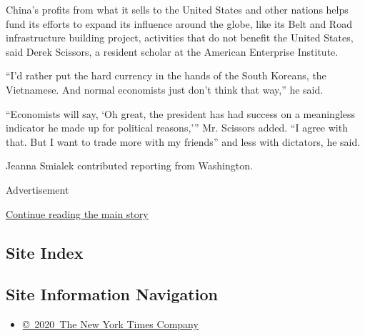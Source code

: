China's profits from what it sells to the United States and other
nations helps fund its efforts to expand its influence around the globe,
like its Belt and Road infrastructure building project, activities that
do not benefit the United States, said Derek Scissors, a resident
scholar at the American Enterprise Institute.

``I'd rather put the hard currency in the hands of the South Koreans,
the Vietnamese. And normal economists just don't think that way,'' he
said.

``Economists will say, `Oh great, the president has had success on a
meaningless indicator he made up for political reasons,''' Mr. Scissors
added. ``I agree with that. But I want to trade more with my friends''
and less with dictators, he said.

Jeanna Smialek contributed reporting from Washington.

Advertisement

\protect\hyperlink{after-bottom}{Continue reading the main story}

\hypertarget{site-index}{%
\subsection{Site Index}\label{site-index}}

\hypertarget{site-information-navigation}{%
\subsection{Site Information
Navigation}\label{site-information-navigation}}

\begin{itemize}
\tightlist
\item
  \href{https://help.nytimes3xbfgragh.onion/hc/en-us/articles/115014792127-Copyright-notice}{©~2020~The
  New York Times Company}
\end{itemize}

